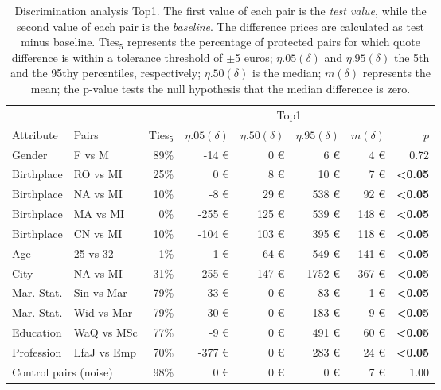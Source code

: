 \begin{table}[tb]
\caption{Discrimination analysis Top1. The first value of each pair is the \textit{test value}, while the second value of each pair is the \textit{baseline}. The difference prices are calculated as test minus baseline. Ties$_{5}$ represents the percentage of protected pairs for which quote difference is within a tolerance threshold of $\pm$5 euros; $\eta.05(\delta)$ and $\eta.95(\delta)$ the 5th and the 95thy percentiles, respectively; $\eta.50(\delta)$ is the median; $m(\delta)$ represents the mean; the p-value tests the null hypothesis that the median difference is zero.}
\label{tab:discrimination-analysis-top1}
\centering
\begin{tabular}{p{1.5cm}p{1.8cm}|rrrrrr}
\toprule
               &             & \multicolumn{6}{c}{Top1} \\ 
Attribute      & Pairs    & Ties$_{5}$  & $\eta.05(\delta)$ & $\eta.50(\delta)$ & $\eta.95(\delta)$ & $m(\delta)$ & $p$ \\\hline
Gender & F vs M & 89\% & -14 € & 0 € & 6 € & 4 € & 0.72 \\
Birthplace & RO vs MI & 25\% & 0 € & 8 € & 10 € & 7 € & \textbf{<0.05} \\
Birthplace & NA vs MI & 10\% & -8 € & 29 € & 538 € & 92 € & \textbf{<0.05} \\
Birthplace & MA vs MI & 0\% & -255 € & 125 € & 539 € & 148 € & \textbf{<0.05} \\
Birthplace & CN vs MI & 10\% & -104 € & 103 € & 395 € & 118 € & \textbf{<0.05} \\
Age & 25 vs 32 & 1\% & -1 € & 64 € & 549 € & 141 € & \textbf{<0.05} \\
City & NA vs MI & 31\% & -255 € & 147 € & 1752 € & 367 € & \textbf{<0.05} \\
Mar. Stat. & Sin vs Mar & 79\% & -33 € & 0 € & 83 € & -1 € & \textbf{<0.05} \\
Mar. Stat. & Wid vs Mar & 79\% & -30 € & 0 € & 183 € & 9 € & \textbf{<0.05} \\
Education & WaQ vs MSc & 77\% & -9 € & 0 € & 491 € & 60 € & \textbf{<0.05} \\
Profession & LfaJ vs Emp & 70\% & -377 € & 0 € & 283 € & 24 € & \textbf{<0.05} \\
\multicolumn{2}{l|}{Control pairs (noise)}  & 98\% & 0 € & 0 € & 0 € & 7 € & 1.00 \\ \hline
\end{tabular}
\end{table}

